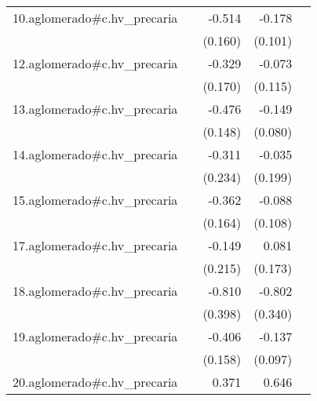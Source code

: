 {\begin{longtable}{l*{4}{D{.}{.}{-1}}}
\addlinespace
10.aglomerado#c.hv\_precaria&                     &      -0.514\sym{**} &      -0.178         &                     \\
            &                     &     (0.160)         &     (0.101)         &                     \\
\addlinespace
12.aglomerado#c.hv\_precaria&                     &      -0.329         &      -0.073         &                     \\
            &                     &     (0.170)         &     (0.115)         &                     \\
\addlinespace
13.aglomerado#c.hv\_precaria&                     &      -0.476\sym{**} &      -0.149         &                     \\
            &                     &     (0.148)         &     (0.080)         &                     \\
\addlinespace
14.aglomerado#c.hv\_precaria&                     &      -0.311         &      -0.035         &                     \\
            &                     &     (0.234)         &     (0.199)         &                     \\
\addlinespace
15.aglomerado#c.hv\_precaria&                     &      -0.362\sym{*}  &      -0.088         &                     \\
            &                     &     (0.164)         &     (0.108)         &                     \\
\addlinespace
17.aglomerado#c.hv\_precaria&                     &      -0.149         &       0.081         &                     \\
            &                     &     (0.215)         &     (0.173)         &                     \\
\addlinespace
18.aglomerado#c.hv\_precaria&                     &      -0.810\sym{*}  &      -0.802\sym{*}  &                     \\
            &                     &     (0.398)         &     (0.340)         &                     \\
\addlinespace
19.aglomerado#c.hv\_precaria&                     &      -0.406\sym{*}  &      -0.137         &                     \\
            &                     &     (0.158)         &     (0.097)         &                     \\
\addlinespace
20.aglomerado#c.hv\_precaria&                     &       0.371         &       0.646\sym{*}  &                     \\

\end{longtable}}
